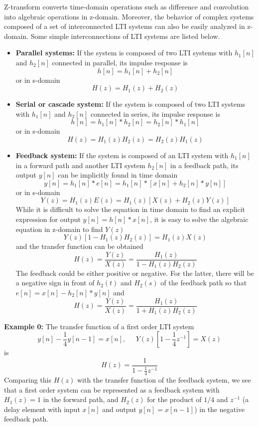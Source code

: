 Z-transform converts time-domain operations such as difference and convolution
into algebraic operations in z-domain. Moreover, the behavior of complex systems
composed of a set of interconnected LTI systems can also be easily analyzed in 
z-domain. Some simple interconnections of LTI systems are listed below.
\begin{itemize}
\item {\bf Parallel systems: } If the system is composed of two LTI systems
with $h_1[n]$ and $h_2[n]$ connected in parallel, its impulse response is
\[ h[n]=h_1[n]+h_2[n]	\]
or in s-domain
\[ H(z)=H_1(z)+H_2(z)	\]

\item {\bf Serial or cascade system: } If the system is composed of two LTI 
systems with $h_1[n]$ and $h_2[n]$ connected in series, its impulse response is
\[ h[n]=h_1[n]*h_2[n]=h_2[n]*h_1[n]	\]
or in s-domain
\[ H(z)=H_1(z)H_2(z)=H_2(z)H_1(z)	\]


\item {\bf Feedback system: } If the system is composed of an LTI system
with $h_1[n]$ in a forward path and another LTI system $h_2[n]$ in a 
feedback path, its output $y[n]$ can be implicitly found in time domain 
\[ y[n]=h_1[n]*e[n]=h_1[n]*[x[n]+h_2[n]*y[n]]	\]
or in s-domain 
\[ Y(z)=H_1(z)E(z)=H_1(z)[X(z)+H_2(z)Y(z)]	\]
While it is difficult to solve the equation in time domain to find an
explicit expression for output $y[n]=h[n]*x[n]$, it is easy to solve the
algebraic equation in z-domain to find $Y(z)$
\[	Y(z)[1-H_1(z)H_2(z)]=H_1(z) X(z)	\]
and the transfer function can be obtained
\[	H(z)=\frac{Y(z)}{X(z)}=\frac{H_1(z)}{1-H_1(z)H_2(z)}	\]
The feedback could be either positive or negative. For the latter, there will 
be a negative sign in front of $h_2(t)$ and $H_2(s)$ of the feedback path so that
$e[n]=x[n]-h_2[n]*y[n]$ and 
\[	H(z)=\frac{Y(z)}{X(z)}=\frac{H_1(z)}{1+H_1(z)H_2(z)}	\]
\end{itemize}

{\bf Example 0: } The transfer function of a first order LTI system
\[ y[n]-\frac{1}{4}y[n-1]=x[n],\;\;\;\;\;Y(z)[1-\frac{1}{4}z^{-1}]=X(z)	\]
is
\[	H(z)=\frac{1}{1-\frac{1}{4}z^{-1}}	\]
Comparing this $H(z)$ with the transfer function of the feedback system, we
see that a first order system can be represented as a feedback system with
$H_1(z)=1$ in the forward path, and $H_2(z)$ for the product of $1/4$ and 
$z^{-1}$ (a delay element with input $x[n]$ and output $y[n]=x[n-1]$) in the
negative feedback path.

